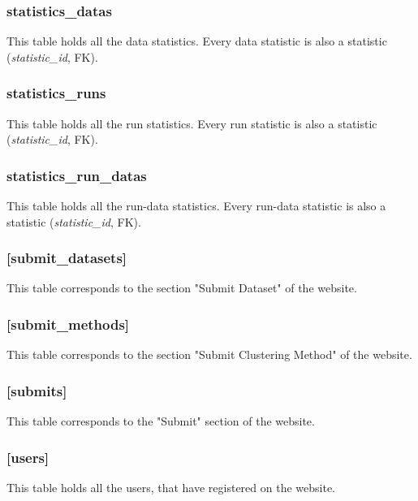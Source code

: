 	\subsubsection{statistics\_datas}
	This table holds all the data statistics. Every data statistic is also a statistic (\textit{statistic\_id}, FK).
	\subsubsection{statistics\_runs}
	This table holds all the run statistics. Every run statistic is also a statistic (\textit{statistic\_id}, FK).
	\subsubsection{statistics\_run\_datas}
	This table holds all the run-data statistics. Every run-data statistic is also a statistic (\textit{statistic\_id}, FK).
	
	\subsubsection{[submit\_datasets]}
	This table corresponds to the section "Submit Dataset" of the website.
	\subsubsection{[submit\_methods]}
	This table corresponds to the section "Submit Clustering Method" of the website.
	\subsubsection{[submits]}
	This table corresponds to the "Submit" section of the website.
	\subsubsection{[users]}
	This table holds all the users, that have registered on the website.